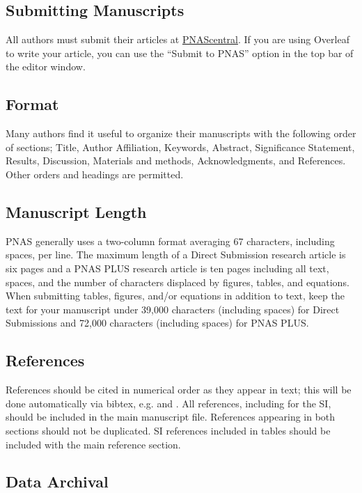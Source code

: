 \documentclass[9pt,twocolumn,twoside]{pnas-new}
\begin{document}
\subsection*{Submitting Manuscripts}

All authors must submit their articles at \href{http://www.pnascentral.org/cgi-bin/main.plex}{PNAScentral}. If you are using Overleaf to write your article, you can use the ``Submit to PNAS'' option in the top bar of the editor window. 

\subsection*{Format}

Many authors find it useful to organize their manuscripts with the following order of sections;  Title, Author Affiliation, Keywords, Abstract, Significance Statement, Results, Discussion, Materials and methods, Acknowledgments, and References. Other orders and headings are permitted.

\subsection*{Manuscript Length}

PNAS generally uses a two-column format averaging 67 characters, including spaces, per line. The maximum length of a Direct Submission research article is six pages and a PNAS PLUS research article is ten pages including all text, spaces, and the number of characters displaced by figures, tables, and equations.  When submitting tables, figures, and/or equations in addition to text, keep the text for your manuscript under 39,000 characters (including spaces) for Direct Submissions and 72,000 characters (including spaces) for PNAS PLUS.

\subsection*{References}

References should be cited in numerical order as they appear in text; this will be done automatically via bibtex, e.g. \cite{belkin2002using} and \cite{berard1994embedding,coifman2005geometric}. All references, including for the SI, should be included in the main manuscript file. References appearing in both sections should not be duplicated.  SI references included in tables should be included with the main reference section. 

\subsection*{Data Archival}
\end{document}
